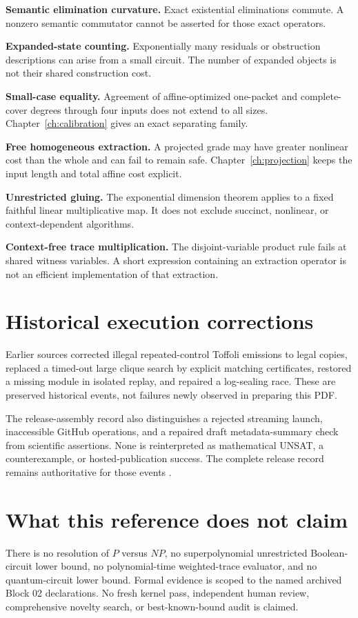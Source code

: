 \documentclass[11pt,letterpaper,oneside]{report}
\theoremstyle{komorebi}
\begin{document}
\textbf{Semantic elimination curvature.} Exact existential eliminations commute. A nonzero semantic commutator cannot be asserted for those exact operators.

\textbf{Expanded-state counting.} Exponentially many residuals or obstruction descriptions can arise from a small circuit. The number of expanded objects is not their shared construction cost.

\textbf{Small-case equality.} Agreement of affine-optimized one-packet and complete-cover degrees through four inputs does not extend to all sizes. Chapter~\ref{ch:calibration} gives an exact separating family.

\textbf{Free homogeneous extraction.} A projected grade may have greater nonlinear cost than the whole and can fail to remain safe. Chapter~\ref{ch:projection} keeps the input length and total affine cost explicit.

\textbf{Unrestricted gluing.} The exponential dimension theorem applies to a fixed faithful linear multiplicative map. It does not exclude succinct, nonlinear, or context-dependent algorithms.

\textbf{Context-free trace multiplication.} The disjoint-variable product rule fails at shared witness variables. A short expression containing an extraction operator is not an efficient implementation of that extraction.

\section{Historical execution corrections}
Earlier sources corrected illegal repeated-control Toffoli emissions to legal copies, replaced a timed-out large clique search by explicit matching certificates, restored a missing module in isolated replay, and repaired a log-sealing race. These are preserved historical events, not failures newly observed in preparing this PDF.

The release-assembly record also distinguishes a rejected streaming launch, inaccessible GitHub operations, and a repaired draft metadata-summary check from scientific assertions. None is reinterpreted as mathematical UNSAT, a counterexample, or hosted-publication success. The complete release record remains authoritative for those events \cite{audit}.

\section{What this reference does not claim}
There is no resolution of $P$ versus $NP$, no superpolynomial unrestricted Boolean-circuit lower bound, no polynomial-time weighted-trace evaluator, and no quantum-circuit lower bound. Formal evidence is scoped to the named archived Block 02 declarations. No fresh kernel pass, independent human review, comprehensive novelty search, or best-known-bound audit is claimed.
\end{document}
